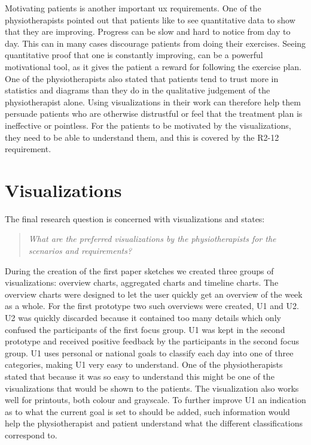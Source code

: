 Motivating patients is another important \gls{ux} requirements. One of the physiotherapists pointed out that patients like to see quantitative data to show that they are improving. Progress can be slow and hard to notice from day to day. This can in many cases discourage patients from doing their exercises. Seeing quantitative proof that one is constantly improving, can be a powerful motivational tool, as it gives the patient a reward for following the exercise plan. One of the physiotherapists also stated that patients tend to trust more in statistics and diagrams than they do in the qualitative judgement of the physiotherapist alone. Using visualizations in their work can therefore help them persuade patients who are otherwise distrustful or feel that the treatment plan is ineffective or pointless. For the patients to be motivated by the visualizations, they need to be able to understand them, and this is covered by the R2-12 requirement. 

\section{Visualizations}
The final research question is concerned with visualizations and states:
\begin{quote}
  \textit{What are the preferred visualizations by the physiotherapists for the scenarios and requirements?}
\end{quote}

During the creation of the first paper sketches we created three groups of visualizations: overview charts, aggregated charts and timeline charts. The overview charts were designed to let the user quickly get an overview of the week as a whole. For the first prototype two such overviews were created, U1 and U2. U2 was quickly discarded because it contained too many details which only confused the participants of the first focus group. U1 was kept in the second prototype and received positive feedback by the participants in the second focus group. U1 uses personal or national goals to classify each day into one of three categories, making U1 very easy to understand. One of the physiotherapists stated that because it was so easy to understand this might be one of the visualizations that would be shown to the patients. The visualization also works well for printouts, both colour and grayscale. To further improve U1 an indication as to what the current goal is set to should be added, such information would help the physiotherapist and patient understand what the different classifications correspond to.

